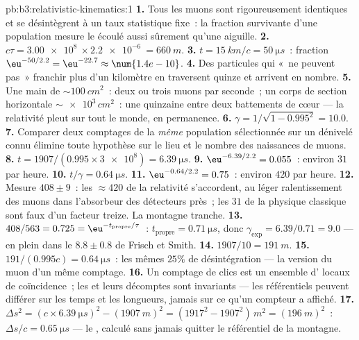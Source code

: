 \begin{solution}{pb:b3:relativistic-kinematics:1}
\textbf{1.} Tous les muons sont rigoureusement identiques et se
désintègrent à un taux statistique fixe~: la fraction survivante d'une
population mesure le  écoulé aussi sûrement qu'une aiguille.
\textbf{2.} $c\tau = \qty{3.00e8}{} \times \qty{2.2e-6}{} =
\qty{660}{m}$.
\textbf{3.} $t = \qty{15}{km}/c = \qty{50}{\micro s}$~: fraction
$\eu^{-50/2.2} = \eu^{-22.7} \approx \num{1.4e-10}$.
\textbf{4.} Des particules qui «~ne peuvent pas~» franchir plus d'un
kilomètre en traversent quinze et arrivent en nombre.
\textbf{5.} Une main de $\sim\qty{100}{cm^2}$~: deux ou trois muons par
seconde~; un corps de section horizontale $\sim\num{e3}\,\unit{cm^2}$~:
une quinzaine entre deux battements de cœur --- la relativité pleut sur
tout le monde, en permanence.
\textbf{6.} $\gamma = 1/\sqrt{1 - 0.995^2} = 10.0$.
\textbf{7.} Comparer deux comptages de la \emph{même} population
sélectionnée sur un dénivelé connu élimine toute hypothèse sur le lieu
et le nombre des naissances de muons.
\textbf{8.} $t = 1907/(0.995 \times \num{3e8}) = \qty{6.39}{\micro s}$.
\textbf{9.} $\eu^{-6.39/2.2} = 0.055$~: environ $31$ par heure.
\textbf{10.} $t/\gamma = \qty{0.64}{\micro s}$.
\textbf{11.} $\eu^{-0.64/2.2} = 0.75$~: environ $420$ par heure.
\textbf{12.} Mesure $408 \pm 9$~: les $\approx 420$ de la relativité
s'accordent, au léger ralentissement des muons dans l'absorbeur des
détecteurs près~; les $31$ de la physique classique sont faux d'un
facteur treize. La montagne tranche.
\textbf{13.} $408/563 = 0.725 = \eu^{-t_{\text{propre}}/\tau}$~:
$t_{\text{propre}} = \qty{0.71}{\micro s}$, donc $\gamma_{\exp} =
6.39/0.71 = 9.0$ --- en plein dans le $8.8 \pm 0.8$ de Frisch et Smith.
\textbf{14.} $1907/10 = \qty{191}{m}$.
\textbf{15.} $191/(0.995c) = \qty{0.64}{\micro s}$~: les mêmes $25\%$
de désintégration --- la version du muon d'un même comptage.
\textbf{16.} Un comptage de clics est un ensemble d' locaux
de coïncidence~; les  et leurs décomptes sont invariants ---
les référentiels peuvent différer sur les temps et les longueurs,
jamais sur ce qu'un compteur a affiché.
\textbf{17.} $\Delta s^2 = (c \times \qty{6.39}{\micro s})^2 -
(\qty{1907}{m})^2 = (1917^2 - 1907^2)\,\unit{m^2} = (\qty{196}{m})^2$~:
$\Delta s/c = \qty{0.65}{\micro s}$ --- le , calculé sans
jamais quitter le référentiel de la montagne.

\end{solution}
